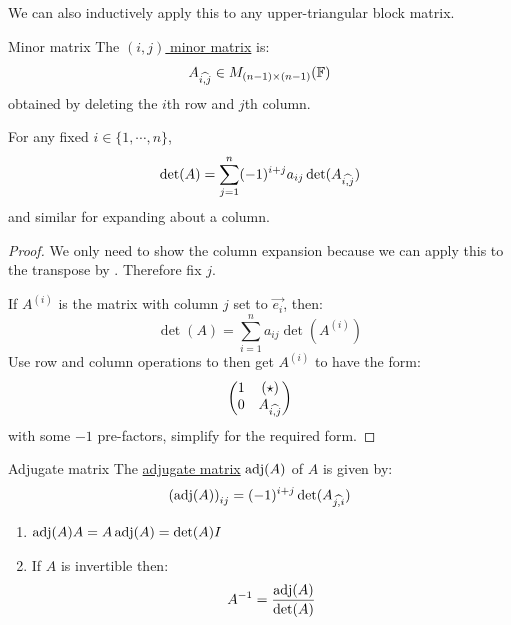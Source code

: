 \documentclass[../Main.tex]{subfiles}
\begin{document}
We can also inductively apply this to any upper-triangular block matrix.
\begin{definition}{Minor matrix}
    The \underline{$(i, j)$ minor matrix} is:
    \begin{equation*}
        {A}_{\widehat{{i},{j}}} \in M_{(n - 1) \times (n - 1)}(\mathbb{F})
    \end{equation*}
    obtained by deleting the $i$th row and $j$th column.
\end{definition}
\begin{theorem}
    For any fixed $i \in \{1, \cdots, n\}$,
    \begin{equation*}
        \det(A) = \sum_{j=1}^{n} (-1)^{i+j} a_{ij} \det({A}_{\widehat{{i},{j}}})
    \end{equation*}
    and similar for expanding about a column.
    \label{thmLaplaceExpansion}
\end{theorem}
\begin{proof}
    We only need to show the column expansion because we can apply this to the transpose by . Therefore fix $j$.

    If $A^{(i)}$ is the matrix with column $j$ set to $\vec{e_i}$, then:
    \begin{equation*}
        \det(A) = \sum_{i=1}^{n} a_{ij} \det(A^{(i)})
    \end{equation*}
    Use row and column operations to then get $A^{(i)}$ to have the form:
    \begin{equation*}
        \begin{pmatrix}
            1 & (\star) \\
            0 & {A}_{\widehat{{i},{j}}}
        \end{pmatrix}
    \end{equation*}
    with some $-1$ pre-factors, simplify for the required form.
\end{proof}
\begin{definition}{Adjugate matrix}
    The \underline{adjugate matrix} $\operatorname{adj}(A)$ of $A$ is given by:
    \begin{equation*}
        \left(\operatorname{adj}(A)\right)_{ij} = (-1)^{i+j} \det({A}_{\widehat{{j},{i}}})
    \end{equation*}
\end{definition}
\begin{theorem}
    \begin{enumerate}
        \item $\operatorname{adj}(A) A = A \operatorname{adj}(A) = \det(A) I$
        \item If $A$ is invertible then:
            \begin{equation*}
                A^{-1} = \frac{\operatorname{adj}(A)}{\det(A)}
            \end{equation*}
    \end{enumerate}
    \label{thmCramer}
\end{theorem}
\end{document}
